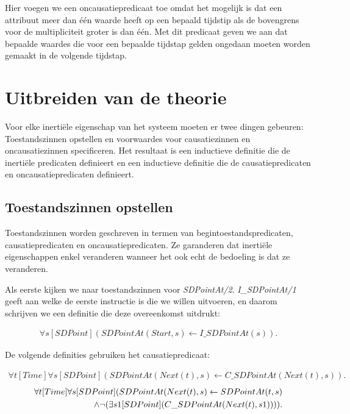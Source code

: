 Hier voegen we een oncausatiepredicaat toe omdat het mogelijk is dat een attribuut meer dan \'e\'en waarde heeft op een bepaald tijdstip als de bovengrens voor de multipliciteit groter is dan \'e\'en. Met dit predicaat geven we aan dat bepaalde waardes die voor een bepaalde tijdstap gelden ongedaan moeten worden gemaakt in de volgende tijdstap.

\section{Uitbreiden van de theorie}\label{sec:cons-to-ltc}
Voor elke inerti\"ele eigenschap van het systeem moeten er twee dingen gebeuren: Toestandszinnen opstellen en voorwaardes voor causatiezinnen en oncausatiezinnen specificeren. Het resultaat is een inductieve definitie die de inerti\"ele predicaten definieert en een inductieve definitie die de causatiepredicaten en oncausatiepredicaten definieert.

\subsection{Toestandszinnen opstellen}
Toestandszinnen worden geschreven in termen van begintoestandspredicaten, causatiepredicaten en oncausatiepredicaten. Ze garanderen dat inerti\"ele eigenschappen enkel veranderen wanneer het ook echt de bedoeling is dat ze veranderen.

Als eerste kijken we naar toestandszinnen voor \textit{SDPointAt/2}. \textit{I\_SDPointAt/1} geeft aan welke de eerste instructie is die we willen uitvoeren, en daarom schrijven we een definitie die deze overeenkomst uitdrukt:

\begin{align}
	\forall{s}[SDPoint](SDPointAt(Start, s) \leftarrow I\_SDPointAt(s)).
\end{align}


De volgende definities gebruiken het causatiepredicaat:

\begin{align}
	\forall{t}[Time]\forall{s}[SDPoint](SDPointAt(Next(t), s) \leftarrow C\_SDPointAt(Next(t), s)). \label{eq:sdcauses}
\end{align}
\begin{align}
	\forall{t}[Time]\forall{s}[SDPoint](SDPointAt(Next(t), s) \leftarrow SDPointAt(t, s) \nonumber \\ \land{} \space \lnot{}(\exists{s1}[SDPoint](C\_SDPointAt(Next(t), s1)))). \label{eq:sduncauses}
\end{align}

